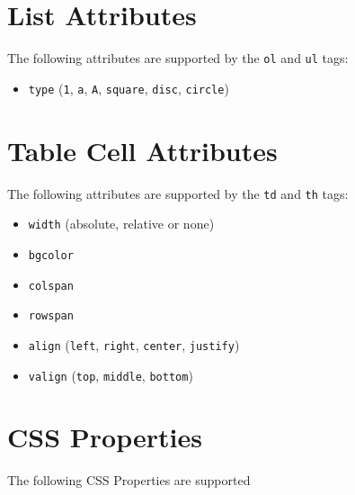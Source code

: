\documentclass[a4paper,10pt]{book}
\begin{document}
\section{List Attributes}
The following attributes are supported by the \verb|ol| and \verb|ul| tags:
\begin{itemize}
\item \verb|type| (\verb|1|, \verb|a|, \verb|A|, \verb|square|, \verb|disc|, \verb|circle|)
\end{itemize}

\section{Table Cell Attributes}
The following attributes are supported by the \verb|td| and \verb|th| tags:
\begin{itemize}
\item \verb|width| (absolute, relative or none)
\item \verb|bgcolor|
\item \verb|colspan|
\item \verb|rowspan|
\item \verb|align| (\verb|left|, \verb|right|, \verb|center|, \verb|justify|)
\item \verb|valign| (\verb|top|, \verb|middle|, \verb|bottom|)
\end{itemize}

\section{CSS Properties}
The following CSS Properties are supported
\end{document}
